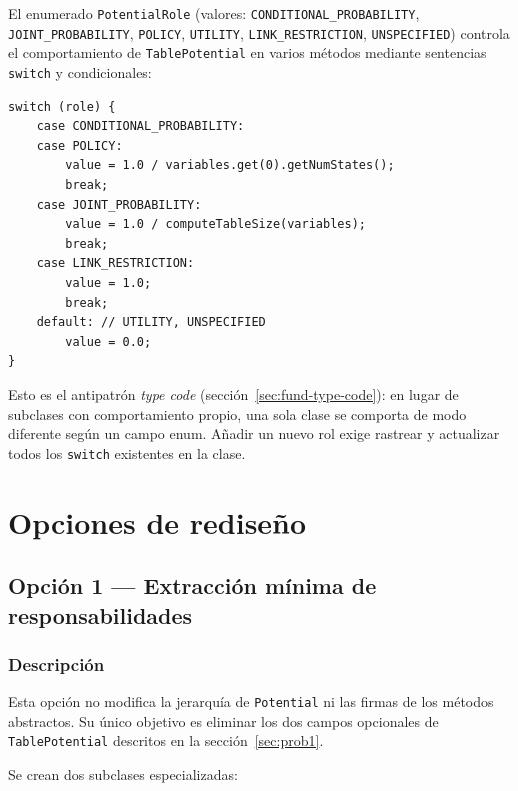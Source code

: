 \documentclass[11pt,a4paper]{article}
\newcommand{\code}[1]{\texttt{#1}}
\begin{document}
El enumerado \code{PotentialRole} (valores: \code{CONDITIONAL\_PROBABILITY},
\code{JOINT\_PROBABILITY}, \code{POLICY}, \code{UTILITY}, \code{LINK\_RESTRICTION},
\code{UNSPECIFIED}) controla el comportamiento de \code{TablePotential} en varios
métodos mediante sentencias \code{switch} y condicionales:

\begin{lstlisting}[caption={\code{PotentialRole} controlando comportamiento en \code{setUniform()}}]
switch (role) {
    case CONDITIONAL_PROBABILITY:
    case POLICY:
        value = 1.0 / variables.get(0).getNumStates();
        break;
    case JOINT_PROBABILITY:
        value = 1.0 / computeTableSize(variables);
        break;
    case LINK_RESTRICTION:
        value = 1.0;
        break;
    default: // UTILITY, UNSPECIFIED
        value = 0.0;
}
\end{lstlisting}

Esto es el antipatrón \emph{type code} (sección~\ref{sec:fund-type-code}): en lugar de subclases con comportamiento
propio, una sola clase se comporta de modo diferente según un campo enum.  Añadir
un nuevo rol exige rastrear y actualizar todos los \code{switch} existentes en la
clase.

\section{Opciones de rediseño}

\subsection{Opción 1 --- Extracción mínima de responsabilidades}
\label{sec:op1}

\subsubsection*{Descripción}

Esta opción no modifica la jerarquía de \code{Potential} ni las firmas de los
métodos abstractos.  Su único objetivo es eliminar los dos campos opcionales
de \code{TablePotential} descritos en la sección~\ref{sec:prob1}.

Se crean dos subclases especializadas:
\end{document}
